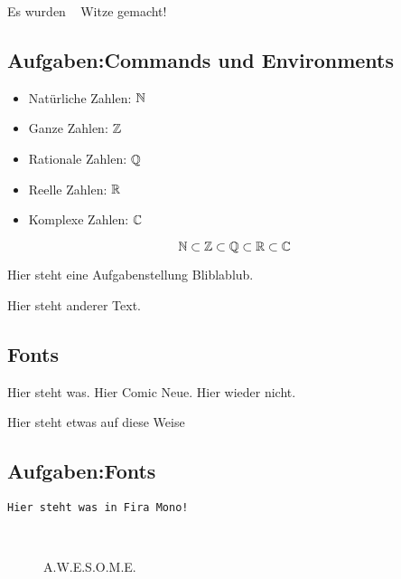 \documentclass[a4paper]{scrartcl}
\begin{document}
\noindent
Es wurden \thejoke~ Witze gemacht!


\subsection*{Aufgaben:\quad Commands und Environments}
\begin{itemize}
    \item Natürliche Zahlen: $\mathbb{N}$
    \item Ganze Zahlen: $\mathbb{Z}$
    \item Rationale Zahlen: $\mathbb{Q}$
    \item Reelle Zahlen: $\mathbb{R}$
    \item Komplexe Zahlen: $\mathbb{C}$
\end{itemize}

\[\mathbb{N} \subset \mathbb{Z} \subset \mathbb{Q} \subset \mathbb{R} \subset \mathbb{C}\]

Hier steht eine Aufgabenstellung Bliblablub.

\begin{loesung}
    \lipsum[5]
\end{loesung}

\noindent
Hier steht anderer Text. \lipsum[2]


\subsection*{Fonts}


Hier steht was.
{\selectfont Hier Comic Neue.}
Hier wieder nicht.

{\noindent\comicneue Hier steht etwas auf diese Weise} \\


\subsection*{Aufgaben:\quad Fonts}

\texttt{Hier steht was in Fira Mono!}

\begin{figure}[h!]
    \centering
    {\Huge \faAd\ \faWikipediaW\ \faEnvelopeOpen[regular]\ \faSleigh\ \faOtter\ \faMicroscope\ \faEyeDropper}
    \caption{A.W.E.S.O.M.E.}
\end{figure}
\end{document}
